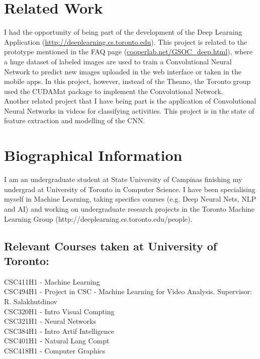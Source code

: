 \documentclass{article}
\begin{document}
\section{Related Work}
I had the opportunity of being part of the development of the Deep Learning Application (\url{http://deeplearning.cs.toronto.edu}). This project is related to the prototype mentioned in the FAQ page (\url{cooperlab.net/GSOC_deep.html}), where a huge dataset of labeled images are used to train a
Convolutional Neural Network to predict new images uploaded in the web interface or taken in the mobile apps. In this project, however, instead of the Theano, the Toronto group used the CUDAMat package to implement the Convolutional Network.\\
Another related project that I have being part is the application of Convolutional Neural Networks in videos for classifying activities. This project is in the state of feature extraction and modelling of the CNN.


\section{Biographical Information}

I am an undergraduate student at State University of Campinas finishing my undergrad at University of Toronto in Computer Science. I have been specialising myself in Machine Learning, taking specifics courses (e.g. Deep Neural Nets, NLP and AI) and working on undergraduate research projects in the Toronto Machine Learning Group (http://deeplearning.cs.toronto.edu/people).

\subsection{Relevant Courses taken at University of Toronto:}

\setlength\parindent{0pt} CSC411H1 - Machine Learning\\
\hfill CSC494H1 - Project in CSC - Machine Learning for Video Analysis. Supervisor: R. Salakhutdinov\\
\hfill CSC320H1 - Intro Visual Compting\\
\hfill CSC321H1 - Neural Networks\\
\hfill CSC384H1 - Intro Artif Intelligence\\
\hfill CSC401H1 - Natural Lang Compt\\
\hfill CSC418H1 - Computer Graphics\\
\end{document}
